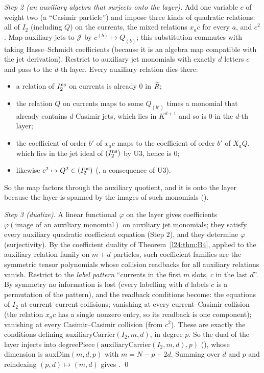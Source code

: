 \emph{Step 2 (an auxiliary algebra that surjects onto the layer).} Add one variable $c$ of weight two (a ``Casimir
particle'') and impose three kinds of quadratic relations: all of $I_2$ (including $Q$) on the currents, the mixed
relations $x_ac$ for every $a$, and $c^2$. Map auxiliary jets to $\mathcal J$ by $c^{(b)}\mapsto Q_{(b)}$; this substitution
commutes with taking Hasse--Schmidt coefficients (because it is an algebra map compatible with the jet derivation). Restrict
to auxiliary jet monomials with exactly $d$ letters $c$ and pass to the $d$-th layer. Every auxiliary relation dies there:
\begin{itemize}
\item a relation of $I_2^{\mathrm{ns}}$ on currents is already $0$ in $\widetilde R$;
\item the relation $Q$ on currents maps to some $Q_{(b')}$ times a monomial that already contains $d$ Casimir jets, which lies
  in $K^{d+1}$ and so is $0$ in the $d$-th layer;
\item the coefficient of order $b'$ of $x_ac$ maps to the coefficient of order $b'$ of $X_aQ$, which lies in the jet ideal of
  $(I_2^{\mathrm{ns}})$ by U3, hence is $0$;
\item likewise $c^2\mapsto Q^2\in(I_2^{\mathrm{ns}})$ (, a consequence of U3).
\end{itemize}
So the map factors through the auxiliary quotient, and it is onto the layer because the layer is spanned by the images
of such monomials ().

\emph{Step 3 (dualize).} A linear functional $\varphi$ on the layer gives coefficients
$\varphi(\text{image of an auxiliary monomial})$ on auxiliary jet monomials; they satisfy every auxiliary quadratic
coefficient equation (Step 2), and they determine $\varphi$ (surjectivity). By the coefficient duality of
Theorem~\ref{l24:thm:B4}, applied to the auxiliary relation family on $m+d$ particles, such coefficient families are the
symmetric tensor polynomials whose collision readbacks for all auxiliary relations vanish. Restrict to the \emph{label
pattern} ``currents in the first $m$ slots, $c$ in the last $d$''. By symmetry no information is lost (every labelling
with $d$ labels $c$ is a permutation of the pattern), and the readback conditions become: the equations of $I_2$ at
current--current collisions; vanishing at every current--Casimir collision (the relation $x_ac$ has a single nonzero entry,
so its readback is one component); vanishing at every Casimir--Casimir collision (from $c^2$). These are exactly the
conditions defining $\mathrm{auxiliaryCarrier}(I_2,m,d)$, in degree $p$. So the dual of the layer injects into
$\mathrm{degreePiece}(\mathrm{auxiliaryCarrier}(I_2,m,d),p)$ (), whose dimension is
$\mathrm{auxDim}(m,d,p)$ with $m=N-p-2d$. Summing over $d$ and $p$ and reindexing $(p,d)\mapsto(m,d)$ gives
. \qed

